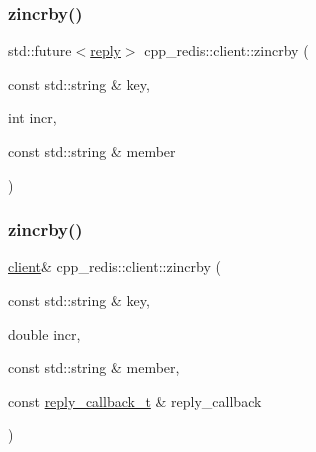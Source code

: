 \mbox{\label{classcpp__redis_1_1client_ada07e0534d23fd0247cdc1b9a8008fe9}} 
\subsubsection{\texorpdfstring{zincrby()}{zincrby()}\hspace{0.1cm}{\footnotesize\ttfamily [2/6]}}
{\footnotesize\ttfamily std\+::future$<$\hyperlink{classcpp__redis_1_1reply}{reply}$>$ cpp\+\_\+redis\+::client\+::zincrby (\begin{DoxyParamCaption}\item[{const std\+::string \&}]{key,  }\item[{int}]{incr,  }\item[{const std\+::string \&}]{member }\end{DoxyParamCaption})}

\mbox{\label{classcpp__redis_1_1client_abeb105281afc762ed57afce5619ef73f}} 
\subsubsection{\texorpdfstring{zincrby()}{zincrby()}\hspace{0.1cm}{\footnotesize\ttfamily [3/6]}}
{\footnotesize\ttfamily \hyperlink{classcpp__redis_1_1client}{client}\& cpp\+\_\+redis\+::client\+::zincrby (\begin{DoxyParamCaption}\item[{const std\+::string \&}]{key,  }\item[{double}]{incr,  }\item[{const std\+::string \&}]{member,  }\item[{const \hyperlink{classcpp__redis_1_1client_a061a1140d36d2eaeda82b09a0bb3f9f2}{reply\+\_\+callback\+\_\+t} \&}]{reply\+\_\+callback }\end{DoxyParamCaption})}

\mbox{\label{classcpp__redis_1_1client_a59164f47b17261f1a82cef5da072aa4c}} 
